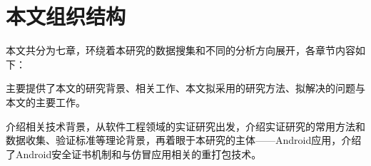 %
%
%
%
%
%
\section{本文组织结构}
本文共分为七章，环绕着本研究的数据搜集和不同的分析方向展开，各章节内容如下：

 主要提供了本文的研究背景、相关工作、本文拟采用的研究方法、拟解决的问题与本文的主要工作。

 介绍相关技术背景，从软件工程领域的实证研究出发，介绍实证研究的常用方法和数据收集、验证标准等理论背景，再着眼于本研究的主体——Android应用，介绍了Android安全证书机制和与仿冒应用相关的重打包技术。

